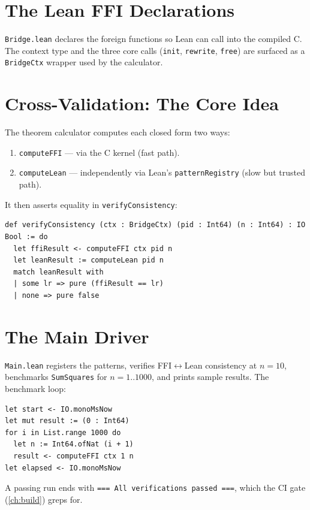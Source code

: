 \section{The Lean FFI Declarations}
\label{sec:ffi-lean}

\texttt{Bridge.lean} declares the foreign functions so Lean can call into the
compiled C. The context type and the three core calls
(\texttt{init}, \texttt{rewrite}, \texttt{free}) are surfaced as a
\texttt{BridgeCtx} wrapper used by the calculator.

\section{Cross-Validation: The Core Idea}
\label{sec:ffi-cross}

The theorem calculator computes each closed form two ways:
\begin{enumerate}
  \item \texttt{computeFFI} --- via the C kernel (fast path).
  \item \texttt{computeLean} --- independently via Lean's
        \texttt{patternRegistry} (slow but trusted path).
\end{enumerate}
It then asserts equality in \texttt{verifyConsistency}:
\begin{lstlisting}[language=Lean4,caption={Consistency check (TheoremCalc/Main.lean).},label=lst:ffi-consistency]
def verifyConsistency (ctx : BridgeCtx) (pid : Int64) (n : Int64) : IO Bool := do
  let ffiResult <- computeFFI ctx pid n
  let leanResult := computeLean pid n
  match leanResult with
  | some lr => pure (ffiResult == lr)
  | none => pure false
\end{lstlisting}

\section{The Main Driver}
\label{sec:ffi-main}

\texttt{Main.lean} registers the patterns, verifies FFI$\leftrightarrow$Lean
consistency at $n=10$, benchmarks \texttt{SumSquares} for $n=1..1000$, and
prints sample results. The benchmark loop:
\begin{lstlisting}[language=Lean4,caption={Benchmark loop (TheoremCalc/Main.lean).},label=lst:ffi-bench]
let start <- IO.monoMsNow
let mut result := (0 : Int64)
for i in List.range 1000 do
  let n := Int64.ofNat (i + 1)
  result <- computeFFI ctx 1 n
let elapsed <- IO.monoMsNow
\end{lstlisting}
A passing run ends with \texttt{=== All verifications passed ===}, which the
CI gate (\cref{ch:build}) greps for.

